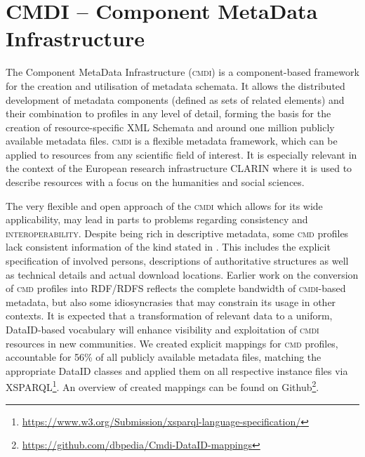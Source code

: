 \documentclass[runningheads,a4paper]{llncs}
\newcommand{\extensibility}{{\scshape extensibility}\xspace}
\newcommand{\interoperability}{{\scshape interoperability}\xspace}
\newcommand{\cmdi}{{\scshape cmdi}\xspace}
\newcommand{\cmd}{{\scshape cmd}\xspace}
\newcommand\footnoteurl[1]{\footnote{\scriptsize\url{#1}}}
\begin{document}
\section{CMDI -- Component MetaData Infrastructure}
\label{cmdi}
The Component MetaData Infrastructure (\cmdi) is a component-based framework for the creation and utilisation of metadata schemata\cite{BROEDER10.163}. It allows the distributed development of metadata components (defined as sets of related elements) and their combination to profiles in any level of detail, forming the basis for the creation of resource-specific XML Schemata and around one million publicly available metadata files. \cmdi is a flexible metadata framework, which can be applied to resources from any scientific field of interest. It is especially relevant in the context of the European research infrastructure CLARIN\cite{Hinrichs2014} where it is used to describe resources with a focus on the humanities and social sciences.

The very flexible and open approach of the \cmdi which allows for its wide applicability, may lead in parts to problems regarding
consistency and \interoperability.
Despite being rich in descriptive metadata, some \cmd profiles lack consistent information of the kind stated in . This includes the explicit specification of involved persons, descriptions of authoritative structures as well as technical details and actual download locations.
Earlier work on the conversion of \cmd profiles into RDF/RDFS\cite{DW2014} reflects the complete bandwidth of \cmdi-based metadata, but also some idiosyncrasies that may constrain its usage in other contexts. It is expected that a transformation of relevant data to a uniform, DataID-based vocabulary will enhance visibility and exploitation of \cmdi resources in new communities.
We created explicit mappings for \cmd profiles, accountable for 56\% of all publicly available metadata files, matching the appropriate DataID classes and applied them on all respective instance files via XSPARQL\footnoteurl{https://www.w3.org/Submission/xsparql-language-specification/}. An overview of created mappings can be found on Github\footnoteurl{https://github.com/dbpedia/Cmdi-DataID-mappings}.
\end{document}

